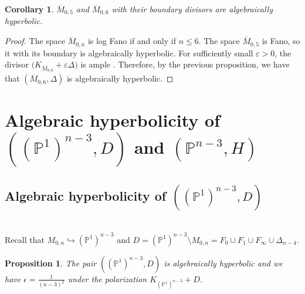 \documentclass{amsart}
\newtheorem{corollary}[theorem]{Corollary}
\newtheorem{proposition}[theorem]{Proposition}
\theoremstyle{definition}
\theoremstyle{remark}
\begin{document}
\begin{corollary}
$\overline{M}_{0,5}$ and $\overline{M}_{0,6}$ with their boundary divisors are algebraically hyperbolic.
\end{corollary}

\begin{proof}
The space $\overline{M}_{0,n}$ is log Fano if and only if $n \leq 6$. The space $\overline{M}_{0,5}$ is Fano, so it with its boundary is algebraically hyperbolic. For sufficiently small $\varepsilon>0$, the divisor $\bigl(K_{\overline{M}_{0,6}} + \varepsilon \Delta)$ is ample \cite{keel1996contractibleextremalraysoverlinem0n}. Therefore, by the previous proposition, we have that $(\overline{M}_{0,6},\Delta)$ is algebraically hyperbolic. 
\end{proof}

\section{Algebraic hyperbolicity of $((\mathbb P^1)^{n-3},D)$ and $(\mathbb P^{n-3},H)$}
\subsection{Algebraic hyperbolicity of $((\mathbb P^1)^{n-3},D)$}\mbox{}\\
Recall that $M_{0,n} \hookrightarrow (\mathbb{P}^1)^{n-3}$ and $D = (\mathbb{P}^1)^{n-3}\setminus M_{0,n}  = F_0\cup F_1\cup F_\infty\cup \Delta_{n-4}$.

\begin{proposition}\label{propk}
The pair $((\mathbb P^1)^{n-3},D)$ is algebraically hyperbolic and we have $\epsilon = \frac 1{(n-3)^2}$ under the polarization $K_{(\mathbb P^1)^{n-3}}+D$.
\end{proposition}
\end{document}
